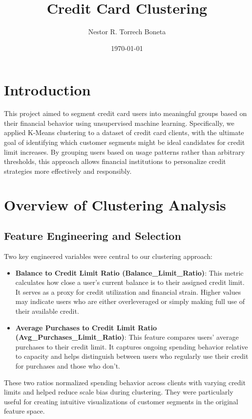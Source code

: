 \documentclass{article}
\title{Credit Card Clustering}
\author{Nestor R. Torrech Boneta}
\date{\today}
\begin{document}
\maketitle

\newpage
\section{Introduction}

This project aimed to segment credit card users into meaningful groups based on their financial behavior using unsupervised machine learning. Specifically, we applied K-Means clustering to a dataset of credit card clients, with the ultimate goal of identifying which customer segments might be ideal candidates for credit limit increases. By grouping users based on usage patterns rather than arbitrary thresholds, this approach allows financial institutions to personalize credit strategies more effectively and responsibly.
\section{Overview of Clustering Analysis}

\subsection{Feature Engineering and Selection}

Two key engineered variables were central to our clustering approach:

\begin{itemize}
    \item \textbf{Balance to Credit Limit Ratio (Balance\_Limit\_Ratio)}: This metric calculates how close a user's current balance is to their assigned credit limit. It serves as a proxy for credit utilization and financial strain. Higher values may indicate users who are either overleveraged or simply making full use of their available credit.
    
    \item \textbf{Average Purchases to Credit Limit Ratio (Avg\_Purchases\_Limit\_Ratio)}: This feature compares users' average purchases to their credit limit. It captures ongoing spending behavior relative to capacity and helps distinguish between users who regularly use their credit for purchases and those who don’t.
\end{itemize}

These two ratios normalized spending behavior across clients with varying credit limits and helped reduce scale bias during clustering. They were particularly useful for creating intuitive visualizations of customer segments in the original feature space.
\end{document}
